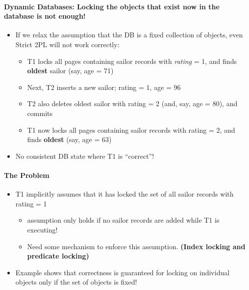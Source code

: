 \paragraph{Dynamic Databases: Locking the objects that exist
  now in the database is not enough!}
\begin{itemize}
\item If we relax the assumption that the DB is a fixed collection
  of objects, even Strict 2PL will not work correctly:
  \begin{itemize}
  \item T1 locks all pages containing sailor records with
    \textit{rating} = 1, and finds \textbf{oldest} sailor (say, age = 71)
  \item Next, T2 inserts a new sailor; rating = 1, age = 96
  \item T2 also deletes oldest sailor with rating = 2 (and, say,
    age = 80), and commits
  \item T1 now locks all pages containing sailor records with
    rating = 2, and finds \textbf{oldest} (say, age = 63)
  \end{itemize}

\item No consistent DB state where T1 is ``correct''!
\end{itemize}

\paragraph{The Problem}
\begin{itemize}
\item T1 implicitly assumes that it has locked the set of all
  sailor records with rating = 1
  \begin{itemize}
  \item assumption only holds if no sailor records are added while
    T1 is executing!
  \item Need some mechanism to enforce this assumption.
    \textbf{(Index locking and predicate locking)}
  \end{itemize}

\item Example shows that correctness is guaranteed for locking on
  individual objects only if the set of objects is fixed!
\end{itemize}



